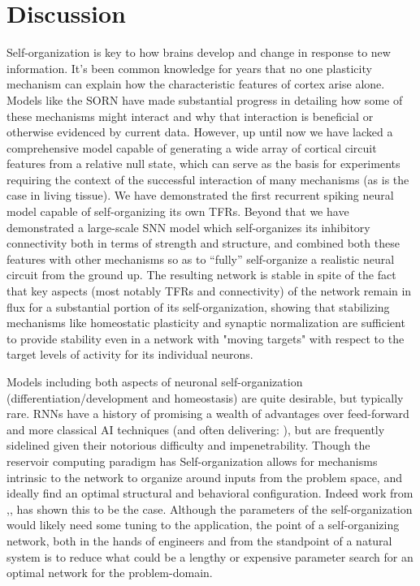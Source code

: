 \documentclass[10pt,letterpaper]{article}
\begin{document}

\section*{Discussion}

Self-organization is key to how brains develop and change in response to new information. It's been common knowledge for years that no one plasticity mechanism can explain how the characteristic features of cortex arise alone. Models like the SORN have made substantial progress in detailing how some of these mechanisms might interact and why that interaction is beneficial or otherwise evidenced by current data. However, up until now we have lacked a comprehensive model capable of generating a wide array of cortical circuit features from a relative null state, which can serve as the basis for experiments requiring the context of the successful interaction of many mechanisms (as is the case in living tissue). We have demonstrated the first recurrent spiking neural model capable of self-organizing its own TFRs. Beyond that we have demonstrated a large-scale SNN model which self-organizes its inhibitory connectivity both in terms of strength and structure, and combined both these features with other mechanisms so as to ``fully'' self-organize a realistic neural circuit from the ground up. The resulting network is stable in spite of the fact that key aspects (most notably TFRs and connectivity) of the network remain in flux for a substantial portion of its self-organization, showing that stabilizing mechanisms like homeostatic plasticity and synaptic normalization are sufficient to provide stability even in a network with "moving targets" with respect to the target levels of activity for its individual neurons.  
	 
Models including both aspects of neuronal self-organization (differentiation/development and homeostasis) are quite desirable, but typically rare. RNNs have a history of promising a wealth of advantages over feed-forward and more classical AI techniques (and often delivering: \cite{verstraeten2005isolated} \cite{graves2013hybrid}), but are frequently sidelined given their notorious difficulty and impenetrability. Though the reservoir computing paradigm has  Self-organization allows for mechanisms intrinsic to the network to organize around inputs from the problem space, and ideally find an optimal structural and behavioral configuration. Indeed work from \cite{lazar2009sorn},\cite{steil2007online, schrauwen2008improving, ju2013effects}, has shown this to be the case. Although the parameters of the self-organization would likely need some tuning to the application, the point of a self-organizing network, both in the hands of engineers and from the standpoint of a natural system is to reduce what could be a lengthy or expensive parameter search for an optimal network for the problem-domain. 
	 
\end{document}
